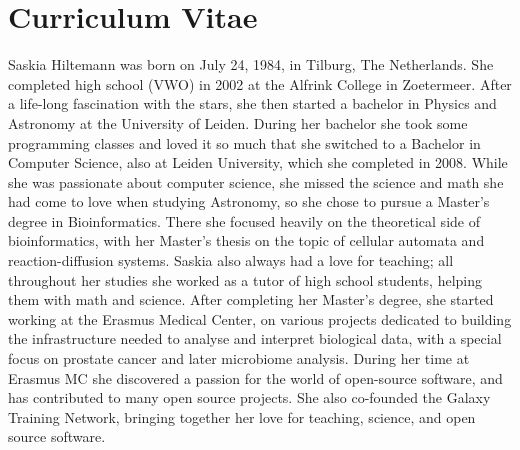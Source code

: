 
\chapter{Curriculum Vitae}
\label{AppendixB}
\vspace{-1cm}
Saskia Hiltemann was born on July 24, 1984, in Tilburg, The Netherlands. She completed high school (VWO) in 2002 at the Alfrink College in Zoetermeer. After a life-long fascination with the stars, she then started a bachelor in Physics and Astronomy at the University of Leiden. During her bachelor she took some programming classes and loved it so much that she switched to a Bachelor in Computer Science, also at Leiden University, which she completed in 2008. While she was passionate about computer science, she missed the science and math she had come to love when studying Astronomy, so she chose to pursue a Master's degree in Bioinformatics. There she focused heavily on the theoretical side of bioinformatics, with her Master's thesis on the topic of cellular automata and reaction-diffusion systems. Saskia also always had a love for teaching; all throughout her studies she worked as a tutor of high school students, helping them with math and science. After completing her Master's degree, she started working at the Erasmus Medical Center, on various projects dedicated to building the infrastructure needed to analyse and interpret biological data, with a special focus on prostate cancer and later microbiome analysis. During her time at Erasmus MC she discovered a passion for the world of open-source software, and has contributed to many open source projects. She also co-founded the Galaxy Training Network, bringing together her love for teaching, science, and open source software.
